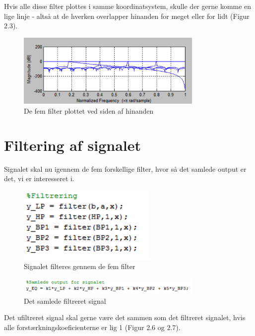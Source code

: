 Hvis alle disse filter plottes i samme koordinatsystem, skulle der gerne komme en lige linje - altså at de hverken overlapper hinanden for meget eller for lidt (Figur 2.3). 

\begin{figure}[H]
	\centering
	\includegraphics[width=0.8\textwidth]{Figur/Snip20151111_65}
	\caption{De fem filter plottet ved siden af hinanden}
\end{figure}


\section{Filtering af signalet}
Signalet skal nu igennem de fem forskellige filter, hvor så det samlede output er det, vi er interesseret i. 

\begin{figure}[H]
	\centering
	\includegraphics[width=0.6\textwidth]{Figur/Snip20151111_66}
	\caption{Signalet filteres gennem de fem filter}
\end{figure}

\begin{figure}[H]
	\centering
	\includegraphics[width=0.8\textwidth]{Figur/Snip20151111_67}
	\caption{Det samlede filtreret signal}
\end{figure}

Det ufiltreret signal skal gerne være det sammen som det filtreret signalet, hvis alle forstærkningskoeficienterne er lig 1 (Figur 2.6 og 2.7).  


